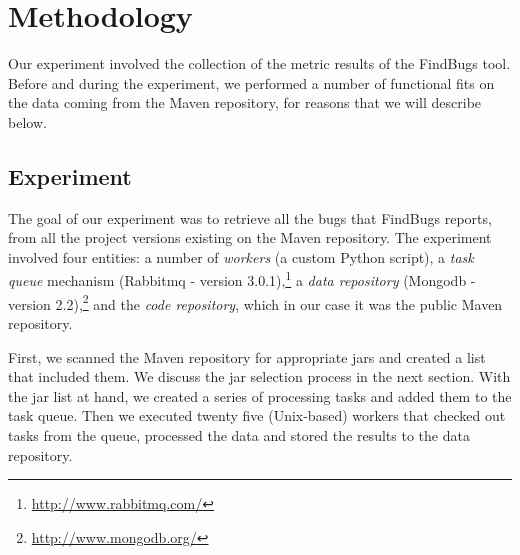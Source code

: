 \documentclass[conference]{llncs}
\begin{document}

\section{Methodology}
\label{sec:meth}

Our experiment involved the collection of the metric results of the FindBugs
tool. Before and during the experiment, we performed a number of functional
fits on the data coming from the Maven repository, for reasons that we will describe below.

\subsection{Experiment}
\label{sec:exp}

The goal of our experiment was to retrieve all the bugs that FindBugs reports,
from all the project versions existing on the Maven repository.
The experiment involved four entities:
a number of {\it workers} (a custom Python script), a {\it task queue}
mechanism (Rabbit{\sc mq} - version 3.0.1),\footnote{\url{http://www.rabbitmq.com/}}
a {\it data repository} (Mongo{\sc db} - version 2.2),\footnote{\url{http://www.mongodb.org/}}
and the {\it code repository}, which in our case it was
the public Maven repository.


First, we scanned the Maven repository for appropriate {\sc jar}s and created a
list that included them. We discuss the {\sc jar} selection process in the next 
section. With the {\sc jar} list at hand, we created a series of processing tasks
and added them to the task queue. Then we executed twenty five (Unix-based)
workers that checked out tasks from the queue, processed the data and stored the
results to the data repository.
\end{document}
